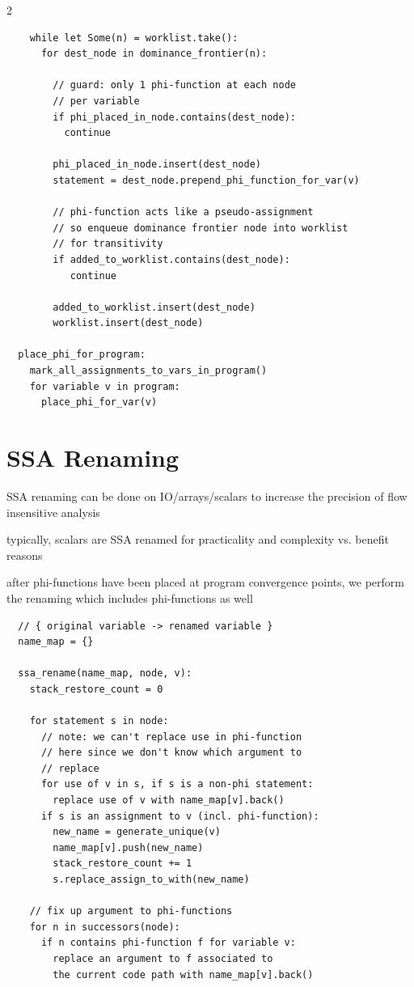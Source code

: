\documentclass[8pt]{extarticle}
\begin{document}
\begin{multicols*}{2}
\begin{verbatim}
    while let Some(n) = worklist.take():
      for dest_node in dominance_frontier(n):

        // guard: only 1 phi-function at each node
        // per variable
        if phi_placed_in_node.contains(dest_node):
          continue

        phi_placed_in_node.insert(dest_node)
        statement = dest_node.prepend_phi_function_for_var(v)

        // phi-function acts like a pseudo-assignment
        // so enqueue dominance frontier node into worklist
        // for transitivity
        if added_to_worklist.contains(dest_node):
           continue

        added_to_worklist.insert(dest_node)
        worklist.insert(dest_node)

  place_phi_for_program:
    mark_all_assignments_to_vars_in_program()
    for variable v in program:
      place_phi_for_var(v)
  \end{verbatim}

  \vfill\null
  \columnbreak
  
  \section{SSA Renaming}

  SSA renaming can be done on IO/arrays/scalars to increase the precision of flow insensitive analysis

  typically, scalars are SSA renamed for practicality and complexity vs. benefit reasons
  
  after phi-functions have been placed at program convergence points, we perform the renaming which includes phi-functions as well

  \begin{verbatim}
  // { original variable -> renamed variable }
  name_map = {}

  ssa_rename(name_map, node, v):
    stack_restore_count = 0

    for statement s in node:
      // note: we can't replace use in phi-function
      // here since we don't know which argument to
      // replace
      for use of v in s, if s is a non-phi statement:
        replace use of v with name_map[v].back()
      if s is an assignment to v (incl. phi-function):
        new_name = generate_unique(v)
        name_map[v].push(new_name)
        stack_restore_count += 1
        s.replace_assign_to_with(new_name)

    // fix up argument to phi-functions
    for n in successors(node):
      if n contains phi-function f for variable v:
        replace an argument to f associated to
        the current code path with name_map[v].back()


\end{verbatim}
\end{multicols*}
\end{document}
